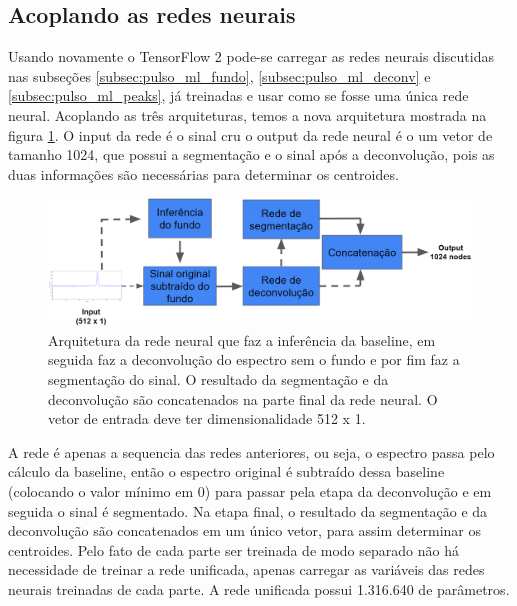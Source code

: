 \documentclass[a4paper,12pt,oneside]{book}
\begin{document}
\subsection{Acoplando as redes neurais}

\par Usando novamente o TensorFlow 2 pode-se carregar as redes neurais discutidas nas subseções \ref{subsec:pulso_ml_fundo}, \ref{subsec:pulso_ml_deconv} e \ref{subsec:pulso_ml_peaks}, já treinadas e usar como se fosse uma única rede neural. Acoplando as três arquiteturas, temos a nova arquitetura mostrada na figura \ref{fig:arq:source_to_segmentation}. O input da rede é o sinal cru o output da rede neural é o um vetor de tamanho 1024, que possui a segmentação e o sinal após a deconvolução, pois as duas informações são necessárias para determinar os centroides.

\begin{figure}[H]
    \centering
    \includegraphics[scale = 0.35]{figs/arq_source_segmentation.png}
    \caption{Arquitetura da rede neural que faz a inferência da baseline, em seguida faz a deconvolução do espectro sem o fundo e por fim faz a segmentação do sinal. O resultado da segmentação e da deconvolução são concatenados na parte final da rede neural. O vetor de entrada deve ter dimensionalidade 512 x 1.}
    \label{fig:arq:source_to_segmentation}
\end{figure}

\par A rede é apenas a sequencia das redes anteriores, ou seja, o espectro passa pelo cálculo da baseline, então o espectro original é subtraído dessa baseline (colocando o valor mínimo em 0) para passar pela etapa da deconvolução e em seguida o sinal é segmentado. Na etapa final, o resultado da segmentação e da deconvolução são concatenados em um único vetor, para assim determinar os centroides. Pelo fato de cada parte ser treinada de modo separado não há necessidade de treinar a rede unificada, apenas carregar as variáveis das redes neurais treinadas de cada parte. A rede unificada possui 1.316.640 de parâmetros.
\end{document}
